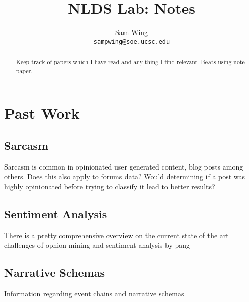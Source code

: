 \documentclass[11pt]{article}
\title{NLDS Lab: Notes}
\author{
	Sam Wing \\
	\texttt{sampwing@soe.ucsc.edu}
}
\date{}                                           %
\begin{document}
\maketitle

\begin{abstract}
Keep track of papers which I have read and any thing I find relevant.  Beats using note paper.
\end{abstract}

\section{Past Work}
\subsection{Sarcasm}
Sarcasm is common in opinionated user generated content, blog posts among others.\cite{icwsm} Does this also apply to forums data?  Would determining if a post was highly opinionated before trying to classify it lead to better results?
\subsection{Sentiment Analysis}
There is a pretty comprehensive overview on the current state of the art challenges of opnion mining and sentiment analysis by pang\cite{pang}

\subsection{Narrative Schemas}
Information regarding event chains\cite{chambers:eventchains} and narrative schemas\cite{chambers:schemas}
\pagebreak


\end{document}
